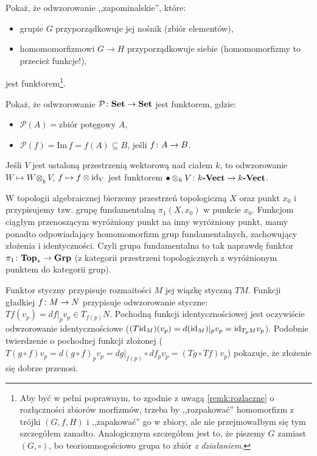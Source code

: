 \begin{exc}
  \label{exc:group_forgetful}
  Pokaż, że odwzorowanie ,,zapominalskie'', które:
  \begin{itemize}
    \item grupie $G$ przyporządkowuje jej nośnik (zbiór elementów),
    \item homomomorfizmowi $G\to H$ przyporządkowuje siebie (homomomorfizmy to przecież funkcje!),
  \end{itemize}
  jest funktorem\footnote{Aby być w pełni poprawnym, to zgodnie z uwagą \ref{remk:rozlaczne} o rozłączności zbiorów morfizmów, trzeba by ,,rozpakować'' homomorfizm z trójki $(G, f, H)$ i ,,zapakować'' go w zbiory, ale nie przejmowałbym się tym szczegółem zanadto. Analogicznym szczegółem jest to, że piszemy $G$ zamiast $(G, \circ)$, bo teoriomnogościowo grupa to zbiór \emph{z działaniem}.}.
\end{exc}

\begin{exc}
  Pokaż, że odwzorowanie $\mathcal P\colon \textbf{Set}\to \textbf{Set}$ jest funktorem, gdzie:
  \begin{itemize}
    \item $\mathcal P(A) = \text{zbiór potęgowy $A$}$,
    \item $\mathcal P(f) = \mathrm{Im}\,f = f(A)\subseteq B$, jeśli $f\colon A\to B$.
  \end{itemize}
\end{exc}

\begin{exmp}
  Jeśli $V$ jest ustaloną przestrzenią wektorową nad ciałem $k$, to odwzorowanie $W\mapsto W\otimes_k V$, $f\mapsto f\otimes \mathrm{id}_{V}$ jest funktorem $\bullet \otimes_k V\colon k\textbf{-Vect}\to k\textbf{-Vect}$.
\end{exmp}

\begin{exmp}
  W topologii algebraicznej bierzemy przestrzeń topologiczną $X$ oraz punkt $x_0$ i przypisujemy tzw. grupę fundamentalną $\pi_1(X, x_0)$ w punkcie $x_0$. Funkcjom ciągłym przenoszącym wyróżniony punkt na inny wyróżniony punkt, mamy ponadto odpowiadający homomomorfizm grup fundamentalnych, zachowujący złożenia i identyczności. Czyli grupa fundamentalna to tak naprawdę funktor $\pi_1\colon \textbf{Top}_*\to \textbf{Grp}$ (z kategorii przestrzeni topologicznych z wyróżnionym punktem do kategorii grup).
\end{exmp}

\begin{exmp}
  Funktor styczny przypisuje rozmaitości $M$ jej wiązkę styczną $TM$. Funkcji gładkiej $f\colon M\to N$ przypisuje odwzorowanie styczne: $Tf(v_p) = df|_pv_p\in T_{f(p)}N$.
  Pochodną funkcji identycznościowej jest oczywiście odwzorowanie identycznościowe ($(T\mathrm{id}_{M})(v_p) = d(\mathrm{id}_{M})|_pv_p = \mathrm{id}_{T_pM} v_p$). Podobnie twierdzenie o pochodnej funkcji złożonej ($T(g\circ f)v_p = d(g\circ f)_p v_p = dg|_{f(p)}\circ df_p v_p = (Tg\circ Tf)v_p$) pokazuje, że złożenie się dobrze przenosi.
\end{exmp}

